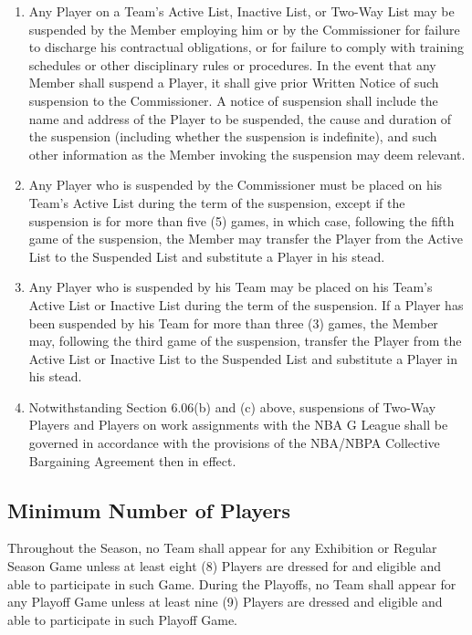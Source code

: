 \documentclass[]{book}
\providecommand{\tightlist}{%
  \setlength{\itemsep}{0pt}\setlength{\parskip}{0pt}}
\begin{document}
\begin{enumerate}
\def\labelenumi{(\alph{enumi})}
\tightlist
\item
  Any Player on a Team's Active List, Inactive List, or Two-Way List may be suspended by the Member employing him or by the Commissioner for failure to discharge his contractual obligations, or for failure to comply with training schedules or other disciplinary rules or procedures. In the event that any Member shall suspend a Player, it shall give prior Written Notice of such suspension to the Commissioner. A notice of suspension shall include the name and address of the Player to be suspended, the cause and duration of the suspension (including whether the suspension is indefinite), and such other information as the Member invoking the suspension may deem relevant.
\item
  Any Player who is suspended by the Commissioner must be placed on his Team's Active List during the term of the suspension, except if the suspension is for more than five (5) games, in which case, following the fifth game of the suspension, the Member may transfer the Player from the Active List to the Suspended List and substitute a Player in his stead.
\item
  Any Player who is suspended by his Team may be placed on his Team's Active List or Inactive List during the term of the suspension. If a Player has been suspended by his Team for more than three (3) games, the Member may, following the third game of the suspension, transfer the Player from the Active List or Inactive List to the Suspended List and substitute a Player in his stead.
\item
  Notwithstanding Section 6.06(b) and (c) above, suspensions of Two-Way Players and Players on work assignments with the NBA G League shall be governed in accordance with the provisions of the NBA/NBPA Collective Bargaining Agreement then in effect.
\end{enumerate}

\hypertarget{minimum-number-of-players}{%
\subsection{Minimum Number of Players}\label{minimum-number-of-players}}

Throughout the Season, no Team shall appear for any Exhibition or Regular Season Game unless at least eight (8) Players are dressed for and eligible and able to participate in such Game. During the Playoffs, no Team shall appear for any Playoff Game unless at least nine (9) Players are dressed and eligible and able to participate in such Playoff Game.
\end{document}
